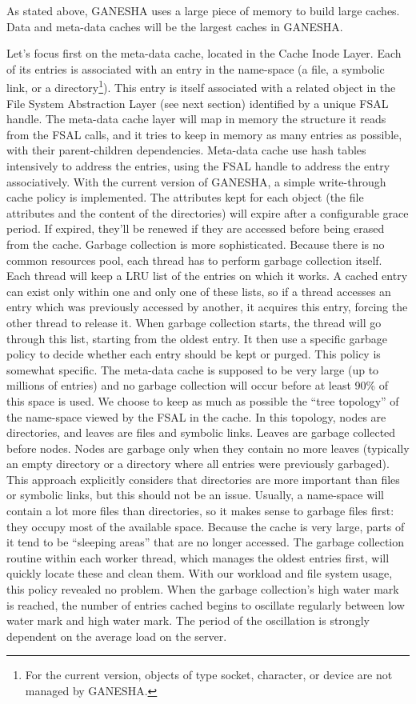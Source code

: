 \documentclass[final]{ols}
\begin{document}
As stated above, GANESHA uses a large piece of memory to build large
caches. Data and meta-data caches will be the largest caches in
GANESHA.

Let's focus first on the meta-data cache, located in the Cache Inode
Layer. Each of its entries is associated with an entry in the
name-space (a file, a symbolic link, or a directory\footnote{For the
  current version, objects of type socket, character, or device are not
  managed by GANESHA.}). This entry is itself associated with a related
object in the File System Abstraction Layer (see next section)
identified by a unique FSAL handle. The meta-data cache layer will map
in memory the structure it reads from the FSAL calls, and it tries to
keep in memory as many entries as possible, with their parent-children
dependencies. Meta-data cache use hash tables intensively to address
the entries, using the FSAL handle to address the entry associatively.
With the current version of GANESHA, a simple write-through cache
policy is implemented. The attributes kept for each object (the file
attributes and the content of the directories) will expire after a
configurable grace period.  If expired, they'll be renewed if they are
accessed before being erased from the cache.  Garbage collection is
more sophisticated. Because there is no common resources pool, each
thread has to perform garbage collection itself. Each thread will
keep a LRU list of the entries on which it works. A cached entry can
exist only within one and only one of these lists, so if a thread
accesses an entry which was previously accessed by another, it
acquires this entry, forcing the other thread to release it. When
garbage collection starts, the thread will go through this list,
starting from the oldest entry. It then use a specific garbage policy
to decide whether each entry should be kept or purged.  This policy is
somewhat specific. The meta-data cache is supposed to be
very large (up to millions of entries) and no garbage collection will
occur before at least 90\% of this space is used. We choose to keep as
much as possible the ``tree topology'' of the name-space viewed by the
FSAL in the cache. In this topology, nodes are directories, and leaves
are files and symbolic links. Leaves are garbage collected before nodes. Nodes
are garbage only when they contain no more leaves (typically an empty
directory or a directory where all entries were previously garbaged).
This approach explicitly considers that directories are more important
than files or symbolic links, but this should not be an issue.
Usually, a name-space will contain a lot more files than directories,
so it makes sense to garbage files first: they occupy most of the
available space.  Because the cache is very large, parts of it tend to
be ``sleeping areas'' that are no longer accessed. The garbage collection
routine within each worker thread, which manages the oldest entries
first, will quickly locate these and clean them. With our workload
and file system usage, this policy revealed no problem. When the
garbage collection's high water mark is reached, the number of entries
cached begins to oscillate regularly between low water mark and high
water mark. The period of the oscillation is strongly dependent on the
average load on the server.
   
\end{document}
